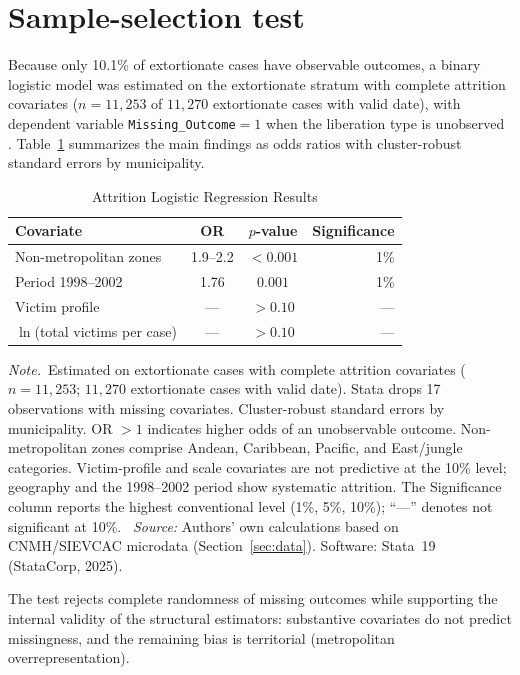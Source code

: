 \documentclass[ecta,nameyear,final,supplement]{econsocart}
\numberwithin{equation}{section}
\numberwithin{table}{section}
\newcommand{\tabnote}{\par\addvspace{0.4em}\noindent\emph{Note.}}
\newcommand{\tabsource}{\ \textit{Source:} Authors' own calculations based on
CNMH/SIEVCAC microdata (Section~\ref{sec:data}). Software: Stata~19
(StataCorp, 2025).}
\begin{document}
\section{Sample-selection test}
\label{sec:selection}

Because only 10.1\% of extortionate cases have observable outcomes, a binary
logistic model was estimated on the extortionate stratum with complete
attrition covariates ($n=11{,}253$ of $11{,}270$ extortionate cases with valid
date), with dependent variable \texttt{Missing\_Outcome}${=}1$ when the liberation
type is unobserved \citep{LittleRubin2020}. Table~\ref{tab:attrition} summarizes
the main findings as odds ratios with cluster-robust standard errors by
municipality.

\begin{table}[t]
\centering
\caption{Attrition Logistic Regression Results}
\label{tab:attrition}
\small
\begin{tabular}{@{}lccr@{}}
\toprule
Covariate & OR & $p$-value & Significance \\
\midrule
Non-metropolitan zones & 1.9--2.2 & $<0.001$ & 1\% \\
Period 1998--2002 & 1.76 & $0.001$ & 1\% \\
Victim profile & --- & $>0.10$ & --- \\
$\ln$(total victims per case) & --- & $>0.10$ & --- \\
\bottomrule
\end{tabular}
\tabnote\ Estimated on extortionate cases with complete attrition covariates
($n=11{,}253$; $11{,}270$ extortionate cases with valid date). Stata drops 17
observations with missing covariates. Cluster-robust standard errors by
municipality. OR $>1$ indicates higher odds of an unobservable outcome.
Non-metropolitan zones comprise Andean, Caribbean, Pacific, and East/jungle
categories. Victim-profile and scale covariates are not predictive at the 10\%
level; geography and the 1998--2002 period show systematic attrition. The
Significance column reports the highest conventional level (1\%, 5\%, 10\%);
``---'' denotes not significant at 10\%.
\tabsource
\end{table}

The test rejects complete randomness of missing outcomes while supporting
the internal validity of the structural estimators: substantive covariates do
not predict missingness, and the remaining bias is territorial (metropolitan
overrepresentation).
\end{document}
